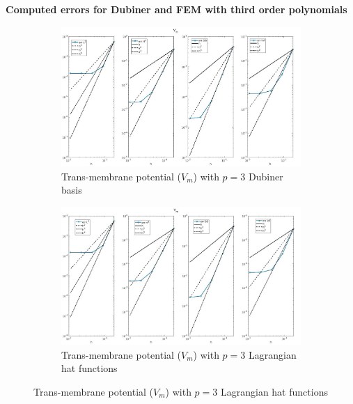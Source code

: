 \documentclass[a4paper,11pt]{article}
\begin{document}
\newpage
\begin{center}
\textbf{Computed errors for Dubiner and FEM with third order polynomials}
\end{center}
\begin{figure}[H]
\caption{Comparison of the trans-membrane potential ($V_m$)}
\label{Vm_3}
\begin{subfigure}{\textwidth}
\begin{center}
\includegraphics[width =\textwidth]{./errors/D3_Vm_1.jpg}
\caption{Trans-membrane potential ($V_m$) with $p=3$ Dubiner basis}
\end{center}
\end{subfigure}
\begin{subfigure}{\textwidth}
\begin{center}
\includegraphics[width =\textwidth]{./errors/P3_Vm_1.jpg}
\caption{Trans-membrane potential ($V_m$) with $p=3$ Lagrangian hat functions}
\end{center}
\end{subfigure}
\end{figure}
\end{document}
